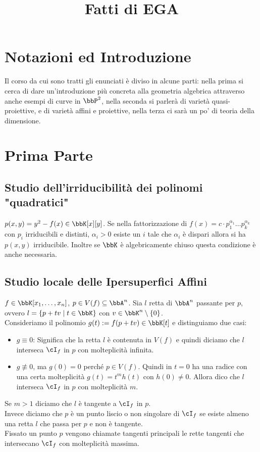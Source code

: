 \documentclass[a4paper,NoNotes,GeneralMath]{stdmdoc}
\begin{document}
	\title{Fatti di EGA}
	
	\section*{Notazioni ed Introduzione}
	Il corso da cui sono tratti gli enunciati è diviso in alcune parti: nella prima si cerca di dare un'introduzione più concreta alla geometria algebrica attraverso anche esempi di curve in $\bbP^2$, nella seconda si parlerà di varietà quasi-proiettive, e di varietà affini e proiettive, nella terza ci sarà un po' di teoria della dimensione.

	\section*{Prima Parte}

	\subsection*{Studio dell'irriducibilità dei polinomi "quadratici"}	
	$p(x,y) = y^2 - f(x) \in \bbK[x][y]$. Se nella fattorizzazione di $f(x) = c \cdot p_1^{\alpha_1} \ldots p_k^{\alpha_k}$ con $p_i$ irriducibili e distinti, $\alpha_i > 0$ esiste un $i$ tale che $\alpha_i$ è dispari allora si ha $p(x,y)$ irriducibile. Inoltre se $\bbK$ è algebricamente chiuso questa condizione è anche necessaria.

	\subsection*{Studio locale delle Ipersuperfici Affini}
	$f \in \bbK[x_1, \ldots, x_n]$, $p \in V(f) \subseteq \bbA^n$. Sia $l$ retta di $\bbA^n$ passante per $p$, ovvero $l = \{p + tv \mid t \in \bbK \}$ con $v \in \bbK^n \setminus \{0\}$. \\

	Consideriamo il polinomio $g(t) := f(p + tv) \in \bbK[t]$ e distinguiamo due casi:
	\begin{itemize}
		\item $g \equiv 0$: Significa che la retta $l$ è contenuta in $V(f)$ e quindi diciamo che $l$ interseca $\cI_f$ in $p$ con molteplicità infinita.
		\item $g \not\equiv 0$, ma $g(0) = 0$ perché $p \in V(f)$. Quindi in $t=0$ ha una radice con una certa molteplicità $g(t) = t^m h(t)$ con $h(0) \neq 0$. Allora dico che $l$ interseca $\cI_f$ in $p$ con molteplicità $m$.
	\end{itemize}
	Se $m > 1$ diciamo che $l$ è tangente a $\cI_f$ in $p$. \\
	Invece diciamo che $p$ è un punto liscio o non singolare di $\cI_f$ se esiste almeno una retta $l$ che passa per $p$ e non è tangente. \\
	Fissato un punto $p$ vengono chiamate tangenti principali le rette tangenti che intersecano $\cI_f$ con molteplicità massima.
\end{document}
